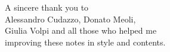 \documentclass[computationalMathematics.tex]{subfiles}
\begin{document}
\phantom{pippo}
\vspace{5cm}
\begin{flushleft}
A sincere thank you to\\
Alessandro Cudazzo, Donato Meoli,\\
Giulia Volpi and all those who helped me\\
improving these notes in style and contents.\\
\end{flushleft}
\newpage


\shipout\null%

\tableofcontents
\let\tableofcontents\relax


\end{document}
